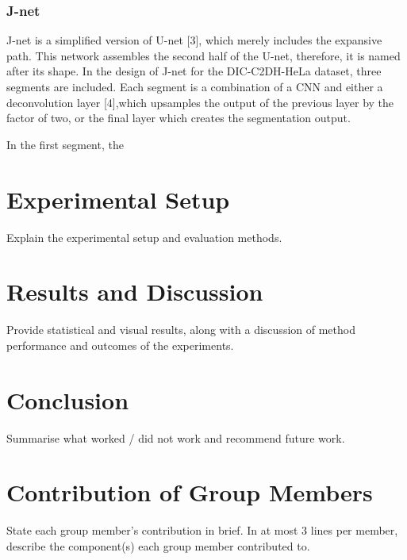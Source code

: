 \documentclass[conference]{IEEEtran}
\begin{document}
\subsubsection{J-net}
J-net is a simplified version of U-net [3], which merely includes the expansive path. This network assembles the second half of the U-net, therefore, it is named after its shape. In the design of J-net for the DIC-C2DH-HeLa dataset, three segments are included. Each segment is a combination of a CNN and either a deconvolution layer [4],which upsamples the output of the previous layer by the factor of two, or the final layer which creates the segmentation output. \par
In the first segment, the 






\section{Experimental Setup}
Explain the experimental setup and evaluation methods.


\section{Results and Discussion}
Provide statistical and visual results, along with a discussion of
method performance and outcomes of the experiments.

\section{Conclusion}
Summarise what worked / did not work and recommend future work.


\section{Contribution of Group Members}
State each group member’s contribution in brief. In at
most 3 lines per member, describe the component(s) each group member contributed to.
\end{document}

